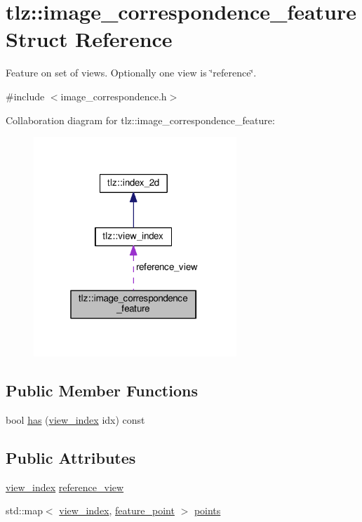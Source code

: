 \hypertarget{structtlz_1_1image__correspondence__feature}{}\section{tlz\+:\+:image\+\_\+correspondence\+\_\+feature Struct Reference}
\label{structtlz_1_1image__correspondence__feature}


Feature on set of views. Optionally one view is \char`\"{}reference\char`\"{}.  




{\ttfamily \#include $<$image\+\_\+correspondence.\+h$>$}



Collaboration diagram for tlz\+:\+:image\+\_\+correspondence\+\_\+feature\+:
\nopagebreak
\begin{figure}[H]
\begin{center}
\leavevmode
\includegraphics[width=217pt]{structtlz_1_1image__correspondence__feature__coll__graph}
\end{center}
\end{figure}
\subsection*{Public Member Functions}
\begin{DoxyCompactItemize}
\item 
bool \hyperlink{structtlz_1_1image__correspondence__feature_a898f080cc19d8f6ef0b3bd67dc968794}{has} (\hyperlink{structtlz_1_1view__index}{view\+\_\+index} idx) const 
\end{DoxyCompactItemize}
\subsection*{Public Attributes}
\begin{DoxyCompactItemize}
\item 
\hyperlink{structtlz_1_1view__index}{view\+\_\+index} \hyperlink{structtlz_1_1image__correspondence__feature_a425e2961c542652a66c6befdba6a03a5}{reference\+\_\+view}
\item 
std\+::map$<$ \hyperlink{structtlz_1_1view__index}{view\+\_\+index}, \hyperlink{structtlz_1_1feature__point}{feature\+\_\+point} $>$ \hyperlink{structtlz_1_1image__correspondence__feature_a418f41569532a41981d3a66e5832a4d0}{points}
\end{DoxyCompactItemize}


